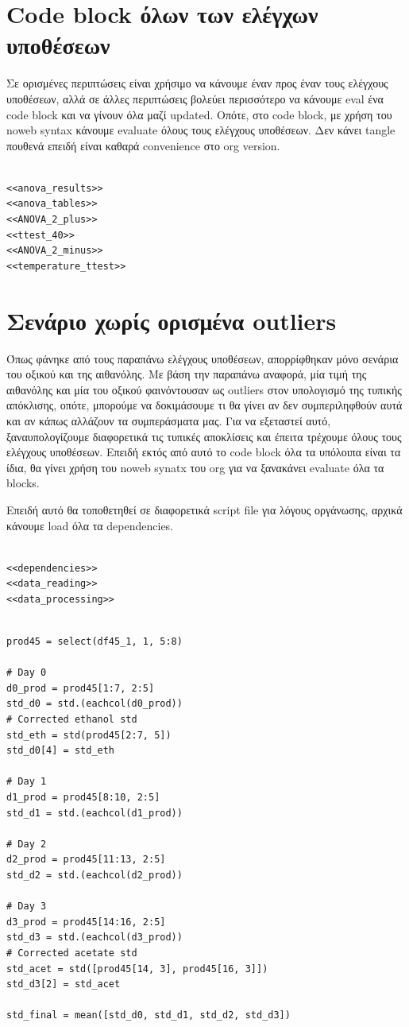 \documentclass[11pt]{article}
\begin{document}
\section{Code block όλων των ελέγχων υποθέσεων}
\label{sec:orge815b27}
Σε ορισμένες περιπτώσεις είναι χρήσιμο να κάνουμε έναν προς έναν τους ελέγχους υποθέσεων, αλλά σε άλλες περιπτώσεις βολεύει περισσότερο να κάνουμε eval ένα code block και να γίνουν όλα μαζί updated. Οπότε, στο code block, με χρήση του noweb syntax κάνουμε evaluate όλους τους ελέγχους υποθέσεων. Δεν κάνει tangle πουθενά επειδή είναι καθαρά convenience στο org version.

\begin{verbatim}

<<anova_results>>
<<anova_tables>>
<<ANOVA_2_plus>>
<<ttest_40>>
<<ANOVA_2_minus>>
<<temperature_ttest>>

\end{verbatim}

\section{Σενάριο χωρίς ορισμένα outliers}
\label{sec:org576cb50}
Όπως φάνηκε από τους παραπάνω ελέγχους υποθέσεων, απορρίφθηκαν μόνο σενάρια του οξικού και της αιθανόλης. Με βάση την παραπάνω αναφορά, μία τιμή της αιθανόλης και μία του οξικού φαινόντουσαν ως outliers στον υπολογισμό της τυπικής απόκλισης, οπότε, μπορούμε να δοκιμάσουμε τι θα γίνει αν δεν συμπεριληφθούν αυτά και αν κάπως αλλάζουν τα συμπεράσματα μας. Για να εξεταστεί αυτό, ξαναυπολογίζουμε διαφορετικά τις τυπικές αποκλίσεις και έπειτα τρέχουμε όλους τους ελέγχους υποθέσεων. Επειδή εκτός από αυτό το code block όλα τα υπόλοιπα είναι τα ίδια, θα γίνει χρήση του noweb synatx του org για να ξανακάνει evaluate όλα τα blocks.

Επειδή αυτό θα τοποθετηθεί σε διαφορετικά script file για λόγους οργάνωσης, αρχικά κάνουμε load όλα τα dependencies.

\begin{verbatim}

<<dependencies>>
<<data_reading>>
<<data_processing>>

\end{verbatim}

\begin{verbatim}

prod45 = select(df45_1, 1, 5:8)

# Day 0
d0_prod = prod45[1:7, 2:5]
std_d0 = std.(eachcol(d0_prod))
# Corrected ethanol std
std_eth = std(prod45[2:7, 5])
std_d0[4] = std_eth

# Day 1
d1_prod = prod45[8:10, 2:5]
std_d1 = std.(eachcol(d1_prod))

# Day 2
d2_prod = prod45[11:13, 2:5]
std_d2 = std.(eachcol(d2_prod))

# Day 3
d3_prod = prod45[14:16, 2:5]
std_d3 = std.(eachcol(d3_prod))
# Corrected acetate std
std_acet = std([prod45[14, 3], prod45[16, 3]])
std_d3[2] = std_acet

std_final = mean([std_d0, std_d1, std_d2, std_d3])
\end{verbatim}
\end{document}
